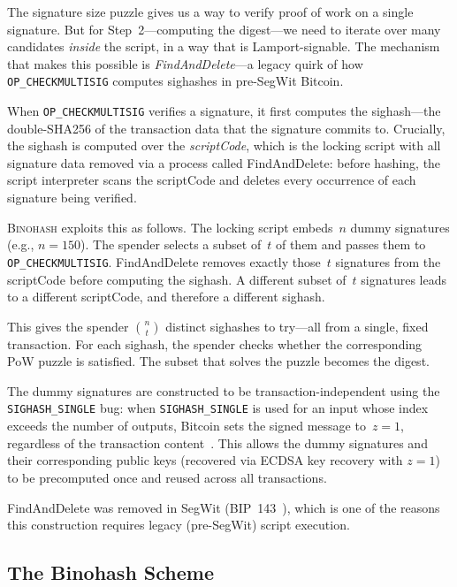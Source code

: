 \documentclass[11pt, a4paper]{article}
\begin{document}
The signature size puzzle gives us a way to verify proof of work on a single signature. But for Step~2---computing the digest---we need to iterate over many candidates \emph{inside} the script, in a way that is Lamport-signable. The mechanism that makes this possible is \emph{FindAndDelete}---a legacy quirk of how \texttt{OP\_CHECKMULTISIG} computes sighashes in pre-SegWit Bitcoin.

When \texttt{OP\_CHECKMULTISIG} verifies a signature, it first computes the sighash---the double-SHA256 of the transaction data that the signature commits to. Crucially, the sighash is computed over the \emph{scriptCode}, which is the locking script with all signature data removed via a process called FindAndDelete: before hashing, the script interpreter scans the scriptCode and deletes every occurrence of each signature being verified.

\textsc{Binohash} exploits this as follows. The locking script embeds~$n$ dummy signatures (e.g., $n = 150$). The spender selects a subset of~$t$ of them and passes them to \texttt{OP\_CHECKMULTISIG}. FindAndDelete removes exactly those~$t$ signatures from the scriptCode before computing the sighash. A different subset of~$t$ signatures leads to a different scriptCode, and therefore a different sighash.

This gives the spender $\binom{n}{t}$ distinct sighashes to try---all from a single, fixed transaction. For each sighash, the spender checks whether the corresponding PoW puzzle is satisfied. The subset that solves the puzzle becomes the digest.

The dummy signatures are constructed to be transaction-independent using the \texttt{SIGHASH\_SINGLE} bug: when \texttt{SIGHASH\_SINGLE} is used for an input whose index exceeds the number of outputs, Bitcoin sets the signed message to~$z = 1$, regardless of the transaction content~\cite{linus2024binohash}. This allows the dummy signatures and their corresponding public keys (recovered via ECDSA key recovery with $z = 1$) to be precomputed once and reused across all transactions.

\noindent FindAndDelete was removed in SegWit (BIP~143~\cite{bip143}), which is one of the reasons this construction requires legacy (pre-SegWit) script execution.

\subsection{The Binohash Scheme}
\label{sec:binohash-scheme}
\end{document}

